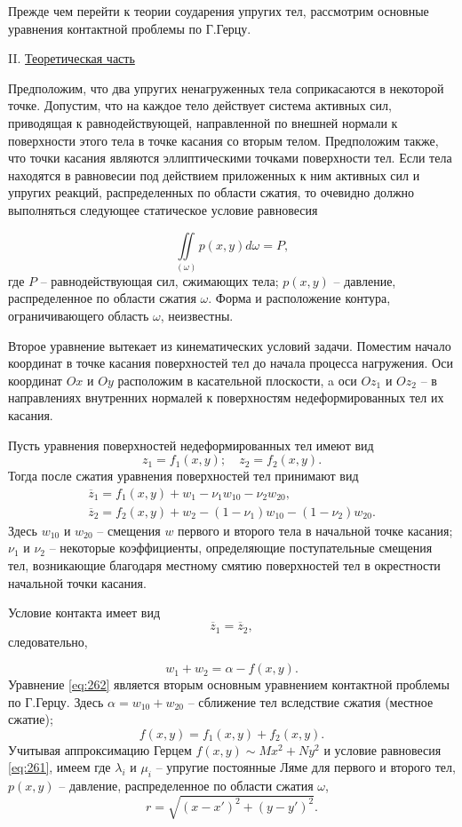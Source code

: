 \documentclass[specialist, subf, href, colorlinks=true, 14pt, final]{disser}
\theoremstyle{definition}
\newcommand{\npart}[2]{\noindent #1. \underline{#2}}
\begin{document}
Прежде чем перейти к теории соударения упругих тел, рассмотрим основные уравнения контактной проблемы по Г.Герцу. 

\npart{II}{Теоретическая часть}

Предположим, что два упругих ненагруженных тела соприкасаются в некоторой точке. Допустим, что на каждое тело действует система активных сил, приводящая к равнодействующей, направленной по внешней нормали к поверхности этого тела в точке касания со вторым телом. Предположим также, что точки касания являются эллиптическими точками поверхности тел. Если тела находятся в равновесии под действием приложенных к ним активных сил и упругих реакций, распределенных по области сжатия, то очевидно должно выполняться следующее статическое условие равновесия
\addtocounter{equation}{1}
\begin{equation}\label{eq:261}
  \iint\limits_{(\omega)} p(x,y)d\omega = P,
  \tag{1}
\end{equation} 
где $P$ -- равнодействующая сил, сжимающих тела; $p(x,y)$ -- давление, распределенное по области сжатия $\omega$. Форма и расположение контура, ограничивающего область $\omega$, неизвестны.

Второе уравнение вытекает из кинематических условий задачи. Поместим начало координат в точке касания поверхностей тел до начала процесса нагружения. Оси координат $Ox$ и $Oy$ расположим в касательной плоскости, a оси $Oz_1$ и $Oz_2$ -- в направлениях внутренних нормалей к поверхностям недеформированных тел их касания.

Пусть уравнения поверхностей недеформированных тел имеют вид
\[
  z_{1} = f_{1}(x,y);\quad z_{2} = f_{2}(x,y).
\]
Тогда после сжатия уравнения поверхностей тел принимают вид
\[
  \begin{array}{l}
  \overline{z}_{1} = f_{1}(x,y) + w_{1} - \nu_{1}w_{10} - \nu_{2}w_{20},\\
  \overline{z}_{2} = f_{2}(x,y) + w_{2} - (1-\nu_{1})w_{10} - (1-\nu_{2})w_{20}.
  \end{array}
\]
Здесь $w_{10}$ и $w_{20}$ -- смещения $w$ первого и второго тела в начальной точке касания; $\nu_1$ и $\nu_2$ -- некоторые коэффициенты, определяющие поступательные смещения тел, возникающие благодаря местному смятию поверхностей тел в окрестности начальной точки касания.

Условие контакта имеет вид
\[ \overline{z}_1 = \overline{z}_2, \]
следовательно,
\addtocounter{equation}{1}
\begin{equation}\label{eq:262}
  w_{1} + w_{2} = \alpha - f(x,y).
  \tag{2}
\end{equation} 
Уравнение \eqref{eq:262} является вторым основным уравнением контактной проблемы по Г.Герцу. Здесь $\alpha = w_{10} + w_{20}$ -- сближение тел вследствие сжатия (местное сжатие);
\[
  f(x,y) = f_{1}(x,y) + f_{2}(x,y).
\]
Учитывая аппроксимацию Герцем $f(x,y) \sim Mx^{2} + Ny^{2}$ и условие равновесия \eqref{eq:261}, имеем
%
где
%
$\lambda_i$ и $\mu_i$ -- упругие постоянные Ляме для первого и второго тел, $p(x,y)$ -- давление, распределенное по области сжатия $\omega$,
\[
  r = \sqrt{(x-x')^{2} + (y-y')^{2}}.
\]
\end{document}
